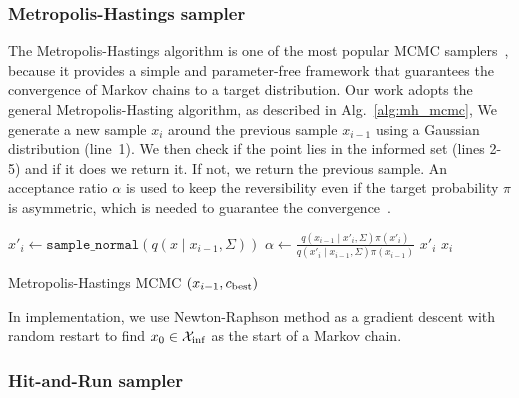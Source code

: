 \documentclass[letterpaper, 10 pt, conference]{ieeeconf}  %
\begin{document}
\subsubsection{Metropolis-Hastings sampler}


The Metropolis-Hastings algorithm is one of the most popular MCMC samplers~\cite{CG95}, because it provides a simple and parameter-free framework that guarantees the convergence of Markov chains to a target distribution.
Our work adopts the general Metropolis-Hasting algorithm, as described in Alg.~\ref{alg:mh_mcmc}, 
We generate a new sample $ x_{i}$ around the previous sample $ x_{i-1}$ using a Gaussian distribution (line~1).
We then check if the point lies in the informed set (lines 2-5) and if it does we return it.
If not, we return the previous sample.
An acceptance ratio $ \alpha $ is used to keep the reversibility even if the target probability $ \pi $ is asymmetric, which is needed to guarantee the convergence~\cite{CG95}. 


\begin{algorithm}[t]
	\begin{algorithmic}[1]
		\STATE $ x'_{i} \leftarrow \texttt{sample\_normal}( q ( x \mid x_{i-1},\Sigma) ) $ 
		\label{start}
		\STATE $ \alpha \leftarrow \frac{ q ( x_{i-1} \mid x'_{i},\Sigma) \pi( x'_{i} ) }{ q ( x'_{i} \mid x_{i-1},\Sigma) \pi( x_{i-1} ) } $
            \RETURN $ x'_{i} $
		\ENDIF
		\RETURN $ x_{i} $
	\end{algorithmic}
	\caption{\captionstyle Metropolis-Hastings MCMC $(x_{i-1}, c_{\rm best})$}
	\label{alg:mh_mcmc}	
\end{algorithm}

In implementation, we use Newton-Raphson method as a gradient descent with random restart to find $ x_0 \in \mathcal{X}_{\rm {inf}} $ as the start of a Markov chain.


\subsubsection{Hit-and-Run sampler}
\end{document}
